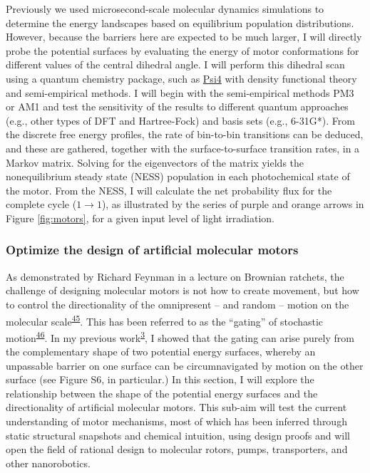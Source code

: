 \documentclass[11pt,notitlepage]{article}
\begin{document}
Previously we used microsecond-scale molecular dynamics simulations to
determine the energy landscapes based on equilibrium population
distributions. However, because the barriers here are expected to be
much larger, I will directly probe the potential surfaces by evaluating
the energy of motor conformations for different values of the central
dihedral angle. I will perform this dihedral scan using a quantum
chemistry package, such as \href{http://psicode.org/}{Psi4} with density
functional theory and semi-empirical methods. I will begin with the
semi-empirical methods PM3 or AM1 and test the sensitivity of the
results to different quantum approaches (e.g., other types of DFT and
Hartree-Fock) and basis sets (e.g., 6-31G*). From the discrete free
energy profiles, the rate of bin-to-bin transitions can be deduced, and
these are gathered, together with the surface-to-surface transition
rates, in a Markov matrix. Solving for the eigenvectors of the matrix
yields the nonequilibrium steady state (NESS) population in each
photochemical state of the motor. From the NESS, I will calculate the
net probability flux for the complete cycle (\(1 \rightarrow 1\)), as
illustrated by the series of purple and orange arrows in Figure
\ref{fig:motors}, for a given input level of light irradiation.

\hypertarget{optimize-the-design-of-artificial-molecular-motors}{%
\subsubsection{Optimize the design of artificial molecular
motors}\label{optimize-the-design-of-artificial-molecular-motors}}

As demonstrated by Richard Feynman in a lecture on Brownian ratchets,
the challenge of designing molecular motors is not how to create
movement, but how to control the directionality of the omnipresent --
and random -- motion on the molecular
scale\textsuperscript{\protect\hyperlink{ref-10FsKpWBI}{45}}. This has
been referred to as the ``gating'' of stochastic
motion\textsuperscript{\protect\hyperlink{ref-qhUBHBOM}{46}}. In my
previous work\textsuperscript{\protect\hyperlink{ref-1BfYw0gk2}{3}}, I
showed that the gating can arise purely from the complementary shape of
two potential energy surfaces, whereby an unpassable barrier on one
surface can be circumnavigated by motion on the other surface (see
Figure S6, in particular.) In this section, I will explore the
relationship between the shape of the potential energy surfaces and the
directionality of artificial molecular motors. This sub-aim will test
the current understanding of motor mechanisms, most of which has been
inferred through static structural snapshots and chemical intuition,
using design proofs and will open the field of rational design to
molecular rotors, pumps, transporters, and other nanorobotics.
\end{document}
